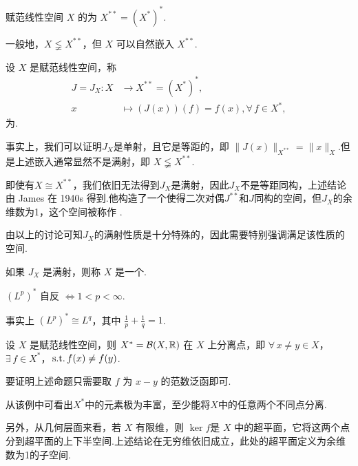 \begin{definition}[二次对偶]
    赋范线性空间 $X$ 的为 $X^{**} = (X^*)^*$.
\end{definition}

一般地，$X \lneqq  X^{**}$，但 $X$ 可以自然嵌入 $X^{**}$.

\begin{definition}[典范等距嵌入]
    设 $X$ 是赋范线性空间，称
    \begin{align*}
        J = J_X: X &\to X^{**} = (X^*)^*, \\
        x &\mapsto (J(x))(f) = f(x),\forall\, f \in X^*,
    \end{align*}
    为.\par
\end{definition}
事实上，我们可以证明$J_X$是单射，且它是等距的，即 $\|J(x)\|_{X^{**}} = \|x\|_X$.但是上述嵌入通常显然不是满射，即 $X \lneqq X^{**}$.
\begin{attention}
    即使有$X\cong X^{**}$，我们依旧无法得到$J_X$是满射，因此$J_X$不是等距同构，上述结论由 James 在 1940s 得到.他构造了一个使得二次对偶$J^{**}$和$J$同构的空间，但$J_X$的余维数为1，这个空间被称作 .
\end{attention}

由以上的讨论可知$J_X$的满射性质是十分特殊的，因此需要特别强调满足该性质的空间.
\begin{definition}[自反空间]
    如果 $J_X$ 是满射，则称 $X$ 是一个.
\end{definition}

\begin{instance}
    $(L^p)^*$ 自反 $\iff 1 < p < \infty$.\par
    事实上 $(L^p)^* \cong L^q$，其中 $\frac{1}{p} + \frac{1}{q} = 1$.
\end{instance}

\begin{instance}
    设 $X$ 是赋范线性空间，则 $X^* = \mathcal{B}(X, \mathbb{R})$ 在 $X$ 上分离点，即 $\forall\, x \neq y \in X$，$\exists\, f \in X^*$，$\operatorname{\,\text{s.t.}} f(x) \neq f(y)$.\par
    要证明上述命题只需要取 $f$ 为 $x-y$ 的范数泛函即可.
\end{instance}
从该例中可看出$X^*$中的元素极为丰富，至少能将$X$中的任意两个不同点分离.\par
另外，从几何层面来看，若 $X$ 有限维，则 $\ker f$是 $X$ 中的超平面，它将这两个点分到超平面的上下半空间.上述结论在无穷维依旧成立，此处的超平面定义为余维数为1的子空间.


